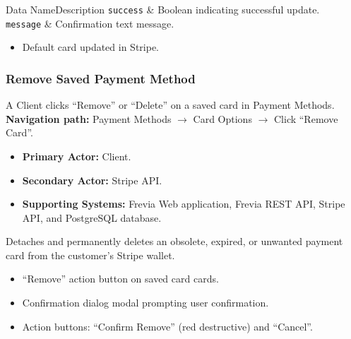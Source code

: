\begin{specdatatable}{Data Name}{Description}
      \texttt{success} & Boolean indicating successful update.\\ \hline
      \texttt{message} & Confirmation text message.\\ \hline
\end{specdatatable}

\begin{itemize}[leftmargin=1.6em,topsep=3pt,itemsep=2pt,parsep=0pt,label=$\bullet$]
      \item Default card updated in Stripe.
\end{itemize}

\subsubsection{ Remove Saved Payment Method}

A Client clicks ``Remove'' or ``Delete'' on a saved card in Payment Methods.\newline
\textbf{Navigation path:} Payment Methods $\rightarrow$ Card Options $\rightarrow$ Click ``Remove Card''.


\begin{itemize}[leftmargin=1.6em,topsep=3pt,itemsep=2pt,parsep=0pt,label=$\bullet$]
      \item \textbf{Primary Actor:} Client.
      \item \textbf{Secondary Actor:} Stripe API.
      \item \textbf{Supporting Systems:} Frevia Web application, Frevia REST API, Stripe API, and PostgreSQL database.
\end{itemize}

\noindent Detaches and permanently deletes an obsolete, expired, or unwanted payment card from the customer's Stripe wallet.

\begin{itemize}[leftmargin=1.6em,topsep=3pt,itemsep=2pt,parsep=0pt,label=$\bullet$]
      \item ``Remove'' action button on saved card cards.
      \item Confirmation dialog modal prompting user confirmation.
      \item Action buttons: ``Confirm Remove'' (red destructive) and ``Cancel''.
\end{itemize}

